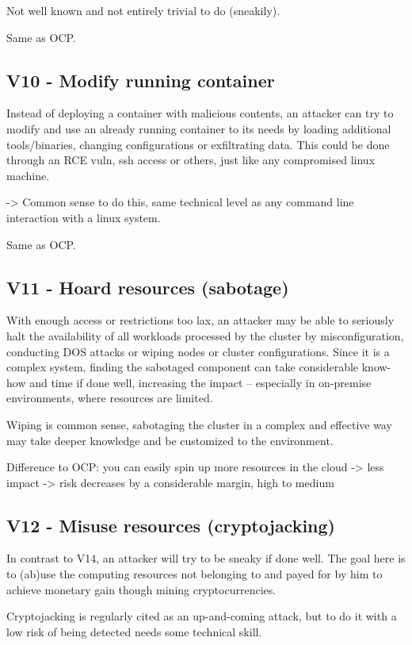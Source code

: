 Not well known and not entirely trivial to do (sneakily).

Same as OCP.

\subsection{V10 - Modify running container}
Instead of deploying a container with malicious contents, an attacker can try to modify and use an already running container to its needs by loading additional tools/binaries, changing configurations or exfiltrating data. This could be done through an RCE vuln, ssh access or others, just like any compromised linux machine.

-> Common sense to do this, same technical level as any command line interaction with a linux system.

Same as OCP.

\subsection{V11 - Hoard resources (sabotage)}
With enough access or restrictions too lax, an attacker may be able to seriously halt the availability of all workloads processed by the cluster by misconfiguration, conducting DOS attacks or wiping nodes or cluster configurations. Since it is a complex system, finding the sabotaged component can take considerable know-how and time if done well, increasing the impact – especially in on-premise environments, where resources are limited.

Wiping is common sense, sabotaging the cluster in a complex and effective way may take deeper knowledge and be customized to the environment.

Difference to OCP: you can easily spin up more resources in the cloud -> less impact
-> risk decreases by a considerable margin, high to medium

\subsection{V12 - Misuse resources (cryptojacking)}
In contrast to V14, an attacker will try to be sneaky if done well.
The goal here is to (ab)use the computing resources not belonging to and payed for by him to achieve monetary gain though mining cryptocurrencies.

Cryptojacking is regularly cited as an up-and-coming attack, but to do it with a low risk of being detected needs some technical skill.

